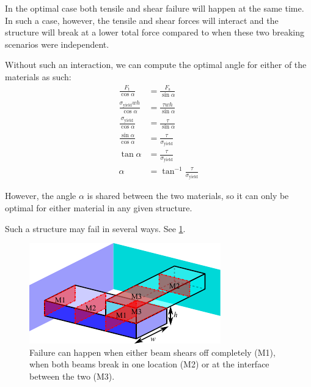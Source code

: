 In the optimal case both tensile and shear failure will happen at the same time.
In such a case, however, the tensile and shear forces will interact and the structure will break at a lower total force compared to when these two breaking scenarios were independent.

Without such an interaction, we can compute the optimal angle for either of the materials as such:
\begin{align}
	\frac{F_\text{t}}{\cos \alpha} &= \frac{F_\text{s}}{\sin \alpha} \\
	\frac{\sigma_\text{yield} w h}{\cos \alpha} &= \frac{\tau w h}{\sin \alpha} \\
	\frac{\sigma_\text{yield}}{\cos \alpha} &= \frac{\tau}{\sin \alpha} \\
	\frac{\sin \alpha}{\cos \alpha} &= \frac{\tau}{\sigma_\text{yield}} \\
	\tan \alpha &= \frac{\tau}{\sigma_\text{yield}} \\
	\alpha &= \tan^{-1} \frac{\tau}{\sigma_\text{yield}}
\end{align}

However, the angle $\alpha$ is shared between the two materials, so it can only be optimal for either material in any given structure.





Such a structure may fail in several ways.
See \cref{fig:failure_modes_diagonal}.

\begin{figure}
	\centering
	\includegraphics[width=.75\columnwidth]{sources/method/failure_modes_diagonal.pdf}
	\caption{Failure can happen when either beam shears off completely (M1), when both beams break in one location (M2) or at the interface between the two (M3).}
	\label{fig:failure_modes_diagonal}
\end{figure}









